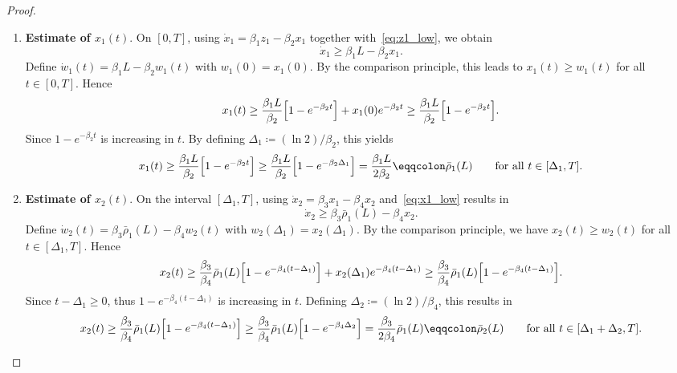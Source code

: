 \documentclass{article}
\begin{document}
\begin{proof}
\begin{enumerate}[leftmargin=*]
    \item \textbf{Estimate of $x_1(t)$}. On $[0,T]$, using 
    $\dot x_1=\beta_1 z_1-\beta_2 x_1$ together with~\eqref{eq:z1_low}, 
    we obtain
    \begin{equation*}
        \dot x_1 \ge \beta_1 L - \beta_2 x_1.
    \end{equation*}
    Define $\dot w_1(t)=\beta_1 L-\beta_2 w_1(t)$ with $w_1(0)=x_1(0)$. 
    By the comparison principle, this leads to $x_1(t)\ge w_1(t)$ for all
    $t\in[0,T]$. Hence
    \begin{equation*}
        x_1(t)\ge \frac{\beta_1 L}{\beta_2}\Bigl[1-e^{-\beta_2 t}\Bigr] 
        + x_1(0)e^{-\beta_2 t}
        \ge \frac{\beta_1 L}{\beta_2}\Bigl[1-e^{-\beta_2 t}\Bigr].
    \end{equation*}
    Since $1-e^{-\beta_2 t}$ is increasing in $t$. By defining $\Delta_1\coloneqq(\ln 2)/\beta_2$, this yields
    \begin{equation}\label{eq:x1_low}
        x_1(t)\ge \frac{\beta_1 L}{\beta_2}\Bigl[1-e^{-\beta_2 t}\Bigr]\ge
        \frac{\beta_1 L}{\beta_2}\Bigl[1-e^{-\beta_2\Delta_1}\Bigr] 
        = \frac{\beta_1 L}{2\beta_2} \eqqcolon \bar\rho_1(L)
        \qquad\text{for all } t\in[\Delta_1,T].
    \end{equation}

    \item \textbf{Estimate of $x_2(t)$}. On the interval $[\Delta_1,T]$, 
    using $\dot x_2=\beta_3 x_1-\beta_4 x_2$ and~\eqref{eq:x1_low} 
    results in
    \begin{equation*}
        \dot x_2 \ge \beta_3\bar\rho_1(L) - \beta_4 x_2.
    \end{equation*}
    Define $\dot w_2(t)=\beta_3\bar\rho_1(L)-\beta_4 w_2(t)$ with 
    $w_2(\Delta_1)=x_2(\Delta_1)$. By the comparison principle, we have 
    $x_2(t)\ge w_2(t)$ for all $t\in[\Delta_1,T]$. Hence
    \begin{equation*}
        x_2(t) \ge \frac{\beta_3}{\beta_4}\bar\rho_1(L)
        \Bigl[1-e^{-\beta_4(t-\Delta_1)}\Bigr]
        + x_2(\Delta_1)e^{-\beta_4(t-\Delta_1)}
        \ge \frac{\beta_3}{\beta_4}\bar\rho_1(L)
        \Bigl[1-e^{-\beta_4(t-\Delta_1)}\Bigr].
    \end{equation*}
    Since $t-\Delta_1\ge0$, thus $1-e^{-\beta_4(t-\Delta_1)}$ is increasing in $t$. Defining $\Delta_2\coloneqq(\ln 2)/\beta_4$, this results in
    \begin{equation}\label{eq:x2_low}
        x_2(t)\ge\frac{\beta_3}{\beta_4}\bar\rho_1(L)
        \Bigl[1-e^{-\beta_4(t-\Delta_1)}\Bigr] \ge 
        \frac{\beta_3}{\beta_4}\bar\rho_1(L)
        \Bigl[1-e^{-\beta_4\Delta_2}\Bigr]
        =\frac{\beta_3}{2\beta_4}\bar\rho_1(L)
        \eqqcolon \bar\rho_2(L) 
        \qquad\text{for all } t\in[\Delta_1+\Delta_2,T].
    \end{equation}


\end{enumerate}
\end{proof}
\end{document}
